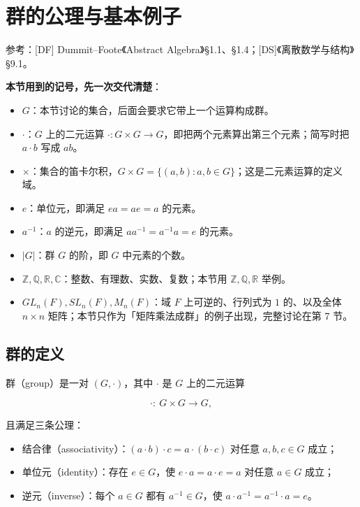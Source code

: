\section{群的公理与基本例子}


参考：[DF] Dummit–Foote《Abstract Algebra》§1.1、§1.4；[DS]《离散数学与结构》§9.1。

\textbf{本节用到的记号，先一次交代清楚}：

\begin{itemize}
\item $G$：本节讨论的集合，后面会要求它带上一个运算构成群。
\item $\cdot$：$G$ 上的二元运算 $\cdot:G\times G\to G$，即把两个元素算出第三个元素；简写时把 $a\cdot b$ 写成 $ab$。
\item $\times$：集合的笛卡尔积，$G\times G=\{(a,b):a,b\in G\}$；这是二元素运算的定义域。
\item $e$：单位元，即满足 $ea=ae=a$ 的元素。
\item $a^{-1}$：$a$ 的逆元，即满足 $aa^{-1}=a^{-1}a=e$ 的元素。
\item $|G|$：群 $G$ 的阶，即 $G$ 中元素的个数。
\item $\mathbb Z,\mathbb Q,\mathbb R,\mathbb C$：整数、有理数、实数、复数；本节用 $\mathbb Z,\mathbb Q,\mathbb R$ 举例。
\item $GL_n(F),SL_n(F),M_n(F)$：域 $F$ 上可逆的、行列式为 $1$ 的、以及全体 $n\times n$ 矩阵；本节只作为「矩阵乘法成群」的例子出现，完整讨论在第 7 节。
\end{itemize}


\subsection{群的定义}


群（group）是一对 $(G,\cdot)$，其中 $\cdot$ 是 $G$ 上的二元运算

\[\cdot:\ G\times G\longrightarrow G,\]

且满足三条公理：

\begin{itemize}
\item 结合律（associativity）：$(a\cdot b)\cdot c=a\cdot(b\cdot c)$ 对任意 $a,b,c\in G$ 成立；
\item 单位元（identity）：存在 $e\in G$，使 $e\cdot a=a\cdot e=a$ 对任意 $a\in G$ 成立；
\item 逆元（inverse）：每个 $a\in G$ 都有 $a^{-1}\in G$，使 $a\cdot a^{-1}=a^{-1}\cdot a=e$。
\end{itemize}


